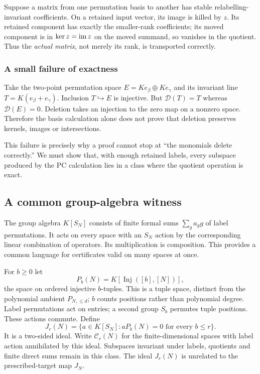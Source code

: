 \documentclass[11pt,a4paper]{article}
\theoremstyle{definition}\newtheorem{definition}[theorem]{Definition}
\theoremstyle{remark}\newtheorem{remark}[theorem]{Remark}
\newcommand{\D}{\mathcal D}\newcommand{\Del}{\mathcal D}\newcommand{\Lift}{\mathsf L}
\DeclareMathOperator{\Inj}{Inj}
\begin{document}
Suppose a matrix from one permutation basis to another has stable relabelling-invariant coefficients. On a retained input vector, its image is killed by $z$. Its retained component has exactly the smaller-rank coefficients; its moved component is in $\ker z=\operatorname{im} z$ on the moved summand, so vanishes in the quotient. Thus the \emph{actual matrix}, not merely its rank, is transported correctly.

\subsubsection{A small failure of exactness}
Take the two-point permutation space $E=Ke_\beta\oplus Ke_\gamma$ and its invariant line $T=K(e_\beta+e_\gamma)$. Inclusion $T\hookrightarrow E$ is injective. But $\D(T)=T$ whereas $\D(E)=0$. Deletion takes an injection to the zero map on a nonzero space. Therefore the basis calculation alone does not prove that deletion preserves kernels, images or intersections.

This failure is precisely why a proof cannot stop at ``the monomials delete correctly.'' We must show that, with enough retained labels, every subspace produced by the PC calculation lies in a class where the quotient operation is exact.

\subsection{A common group-algebra witness}\label{sec:common}
The group algebra $K[S_N]$ consists of finite formal sums $\sum_ga_gg$ of label permutations. It acts on every space with an $S_N$ action by the corresponding linear combination of operators. Its multiplication is composition. This provides a common language for certificates valid on many spaces at once.

For $b\ge0$ let
\[P_b(N)=K[\Inj([b],[N])],\]
the space on ordered injective $b$-tuples. This is a tuple space, distinct from the polynomial ambient $P_{N,\le d}$; $b$ counts positions rather than polynomial degree. Label permutations act on entries; a second group $S_b$ permutes tuple positions. These actions commute. Define
\[J_r(N)=\{a\in K[S_N]:aP_b(N)=0\text{ for every }b\le r\}.\]
It is a two-sided ideal. Write $\mathcal C_r(N)$ for the finite-dimensional spaces with label action annihilated by this ideal. Subspaces invariant under labels, quotients and finite direct sums remain in this class.
The ideal $J_r(N)$ is unrelated to the prescribed-target map $J_N$.
\end{document}
